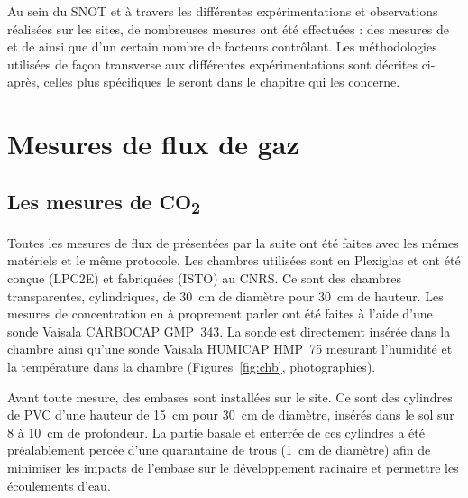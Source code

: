 Au sein du SNOT et à travers les différentes expérimentations et observations réalisées sur les sites, de nombreuses mesures ont été effectuées : des mesures de \coo et de \chh ainsi que d'un certain nombre de facteurs contrôlant.
Les méthodologies utilisées de façon transverse aux différentes expérimentations sont décrites ci-après, celles plus spécifiques le seront dans le chapitre qui les concerne.

\section{Mesures de flux de gaz}
\label{sec:clsd_chbr_method}

\subsection{Les mesures de \texorpdfstring{CO\textsubscript{2}}{CO2}}
\label{subsec:ss_mes_co2}

Toutes les mesures de flux de \coo présentées par la suite ont été faites avec les mêmes matériels et le même protocole.
Les chambres utilisées sont en Plexiglas\textsuperscript{\textregistered} et ont été conçue (LPC2E) et fabriquées (ISTO) au CNRS.
Ce sont des chambres transparentes, cylindriques, de \SI{30}{\centi\metre} de diamètre pour \SI{30}{\centi\metre} de hauteur.
Les mesures de concentration en \coo à proprement parler ont été faites à l'aide d'une sonde Vaisala CARBOCAP\textsuperscript{\textregistered} GMP~343.
La sonde est directement insérée dans la chambre ainsi qu'une sonde Vaisala HUMICAP\textsuperscript{\textregistered} HMP~75 mesurant l'humidité et la température dans la chambre (Figures~\ref{fig:chb}, photographies).

Avant toute mesure, des embases sont installées sur le site.
Ce sont des cylindres de PVC d'une hauteur de \SI{15}{\centi\metre} pour \SI{30}{\centi\metre} de diamètre, insérés dans le sol sur 8 à \SI{10}{\centi\metre} de profondeur.
La partie basale et enterrée de ces cylindres a été préalablement percée d'une quarantaine de trous (\SI{1}{\centi\metre} de diamètre) afin de minimiser les impacts de l'embase sur le développement racinaire et permettre les écoulements d'eau.

